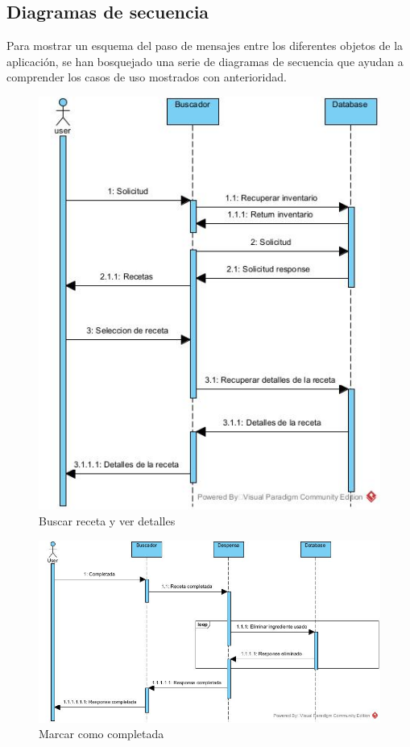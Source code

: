 \subsection{Diagramas de secuencia}
Para mostrar un esquema del paso de mensajes entre los diferentes objetos de la aplicación, se han bosquejado una serie de diagramas de secuencia que ayudan a comprender los casos de uso mostrados con anterioridad.

\begin{figure}[h!]
\centering
\includegraphics[width=125mm,scale=1]{imagenes/Buscar Receta y ver detalles.jpg}
\caption{Buscar receta y ver detalles}
\label{fig:buscar}
\end{figure}
\begin{figure}[h!]
\centering
\includegraphics[width=125mm,scale=1]{imagenes/Marcar como completada.jpg}
\caption{Marcar como completada}
\label{fig:completada}
\end{figure}

